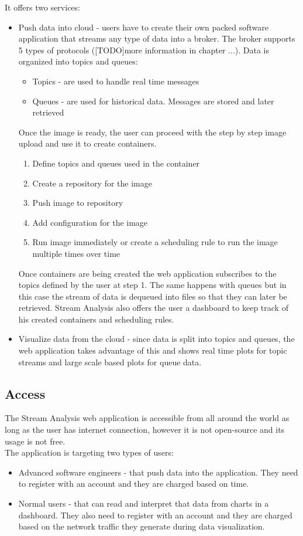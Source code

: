 It offers two services:
\begin{itemize}
	\item Push data into cloud - users have to create their own packed software application that streams any type of data into a broker. The broker supports 5 types of protocols ([TODO]more information in chapter ...). Data is organized into topics and queues:
	\begin{itemize}
		\item Topics - are used to handle real time messages
		\item Queues - are used for historical data. Messages are stored and later retrieved
	\end{itemize}
	Once the image is ready, the user can proceed with the step by step image upload and use it to create containers. 
	\begin{enumerate}
		\item Define topics and queues used in the container
		\item Create a repository for the image
		\item Push image to repository
		\item Add configuration for the image
		\item Run image immediately or create a scheduling rule to run the image multiple times over time
	\end{enumerate}
	Once containers are being created the web application subscribes to the topics defined by the user at step 1. The same happens with queues but in this case the stream of data is dequeued into files so that they can later be retrieved.
	Stream Analysis also offers the user a dashboard to keep track of his created containers and scheduling rules.
	\item Visualize data from the cloud - since data is split into topics and queues, the web application takes advantage of this and shows real time plots for topic streams and large scale based plots for queue data.
\end{itemize}

\subsection{Access}
\label{chap:02:02:02}
The Stream Analysis web application is accessible from all around the world as long as the user has internet connection, however it is not open-source and its usage is not free.\\

The application is targeting two types of users:
\begin{itemize}
	\item Advanced software engineers - that push data into the application. They need to register with an account and they are charged based on time.
	\item Normal users - that can read and interpret that data from charts in a dashboard. They also need to register with an account and they are charged based on the network traffic they generate during data visualization.
\end{itemize}

